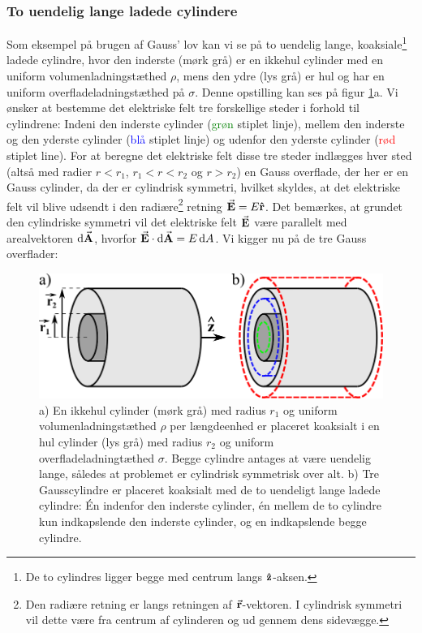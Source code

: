 \subsubsection{To uendelig lange ladede cylindere} \label{sec:gauss_lov_eksempel}
Som eksempel på brugen af Gauss' lov kan vi se på to uendelig lange, koaksiale\footnote{De to cylindres ligger begge med centrum langs $\vu{z}$-aksen.} ladede cylindre, hvor den inderste (mørk grå) er en ikkehul cylinder med en uniform volumenladningstæthed $\rho$, mens den ydre (lys grå) er hul og har en uniform overfladeladningstæthed på $\sigma$. Denne opstilling kan ses på figur \ref{fig:GaussLawExample}a. Vi ønsker at bestemme det elektriske felt tre forskellige steder i forhold til cylindrene: Indeni den inderste cylinder (\textcolor{green}{grøn} stiplet linje), mellem den inderste og den yderste cylinder (\textcolor{blue}{blå} stiplet linje) og udenfor den yderste cylinder (\textcolor{red}{rød} stiplet line). For at beregne det elektriske felt disse tre steder indlægges hver sted (altså med radier $r < r_1$, $r_1 < r < r_2$ og $r > r_2$) en Gauss overflade, der her er en Gauss cylinder, da der er cylindrisk symmetri, hvilket skyldes, at det elektriske felt vil blive udsendt i den radiære\footnote{Den radiære retning er langs retningen af $\va{r}$-vektoren. I cylindrisk symmetri vil dette være fra centrum af cylinderen og ud gennem dens sidevægge.} retning $\va{E} = E\vu{r}$. Det bemærkes, at grundet den cylindriske symmetri vil det elektriske felt $\va{E}$ være parallelt med arealvektoren $\dd{\va{A}}$, hvorfor $\va{E} \cdot \dd{\va{A}} = E\dd{A}$. Vi kigger nu på de tre Gauss overflader:

\begin{figure}[t]
    \centering
    \includegraphics[width=\textwidth]{Elektro/Figurer/GaussLawExample.png}
    \caption{a) En ikkehul cylinder (mørk grå) med radius $r_1$ og uniform volumenladningstæthed $\rho$ per længdeenhed er placeret koaksialt i en hul cylinder (lys grå) med radius $r_2$ og uniform overfladeladningtæthed $\sigma$. Begge cylindre antages at være uendelig lange, således at problemet er cylindrisk symmetrisk over alt. b) Tre Gausscylindre er placeret koaksialt med de to uendeligt lange ladede cylindre: Én indenfor den inderste cylinder, én mellem de to cylindre kun indkapslende den inderste cylinder, og en indkapslende begge cylindre.}
    \label{fig:GaussLawExample}
\end{figure}

